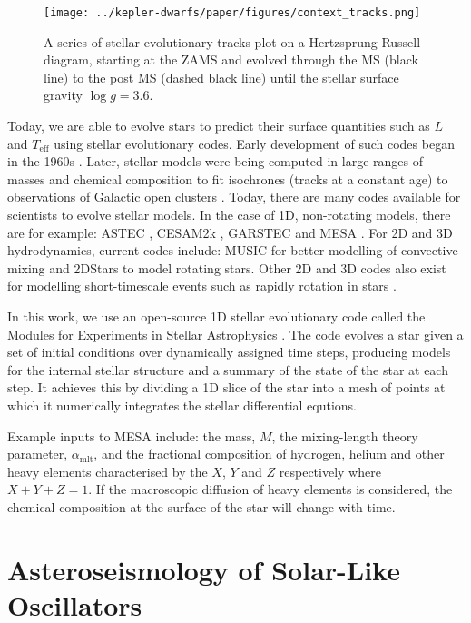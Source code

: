 \begin{figure}[ht]
    \centering
    \texttt{[image: ../kepler-dwarfs/paper/figures/context\_tracks.png]}
    \caption{A series of stellar evolutionary tracks plot on a Hertzsprung-Russell diagram, starting at the ZAMS and evolved through the MS (black line) to the post MS (dashed black line) until the stellar surface gravity $\log g=3.6$.}
    \label{fig:track}
\end{figure}

Today, we are able to evolve stars to predict their surface quantities such as $L$ and $T_\mathrm{eff}$ using stellar evolutionary codes. Early development of such codes began in the 1960s \citep[see e.g.][]{Kippenhahn.Weigert.ea1967}. Later, stellar models were being computed in large ranges of masses and chemical composition to fit isochrones (tracks at a constant age) to observations of Galactic open clusters \citep{Vandenberg1985}. Today, there are many codes available for scientists to evolve stellar models. In the case of 1D, non-rotating models, there are for example: ASTEC \citep{Christensen-Dalsgaard2008}, CESAM2k \citep{Morel.Lebreton2008}, GARSTEC \citep{Weiss.Schlattl2008} and MESA \citep{Paxton.Bildsten.ea2011}. For 2D and 3D hydrodynamics, current codes include: MUSIC \citep{Baraffe.Pratt.ea2017} for better modelling of convective mixing and 2DStars \citep{Halabi.Izzard.ea2017} to model rotating stars. Other 2D and 3D codes also exist for modelling short-timescale events such as rapidly rotation in stars \citep{Roxburgh2004}.

In this work, we use an open-source 1D stellar evolutionary code called the Modules for Experiments in Stellar Astrophysics \citep[MESA;][]{Paxton.Bildsten.ea2011}. The code evolves a star given a set of initial conditions over dynamically assigned time steps, producing models for the internal stellar structure and a summary of the state of the star at each step. It achieves this by dividing a 1D slice of the star into a mesh of points at which it numerically integrates the stellar differential equtions. 

Example inputs to MESA include: the mass, $M$, the mixing-length theory parameter, $\alpha_\mathrm{mlt}$, and the fractional composition of hydrogen, helium and other heavy elements characterised by the $X$, $Y$ and $Z$ respectively where $X+Y+Z=1$. If the macroscopic diffusion of heavy elements is considered, the chemical composition at the surface of the star will change with time.

\section{Asteroseismology of Solar-Like Oscillators}\label{sec:seismo}

